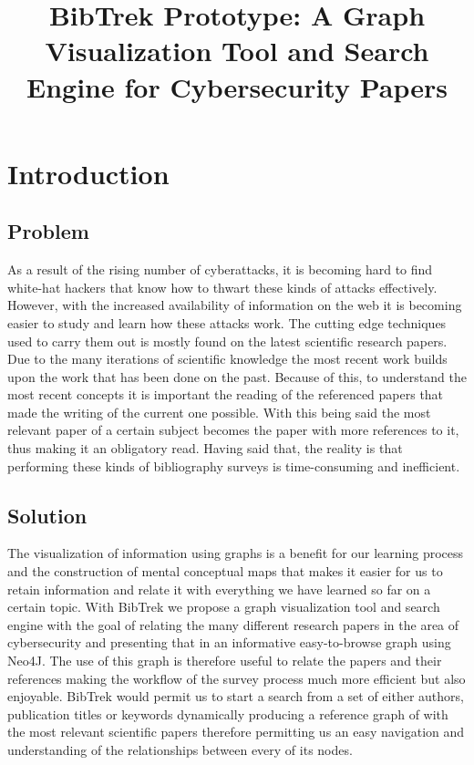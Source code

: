 \documentclass{article}
\begin{document}
\title{\textbf{BibTrek Prototype: A Graph Visualization Tool and Search Engine for Cybersecurity Papers}}
\date{}
\maketitle

\section{Introduction}
\subsection{Problem}
As a result of the rising number of cyberattacks, it is becoming hard to find white-hat hackers that know how to thwart these kinds of attacks effectively. However, with the increased availability of information on the web it is becoming easier to study and learn how these attacks work. The cutting edge techniques used to carry them out is mostly found on the latest scientific research papers. Due to the many iterations of scientific knowledge the most recent work builds upon the work that has been done on the past. Because of this, to understand the most recent concepts it is important the reading of the referenced papers that made the writing of the current one possible. With this being said the most relevant paper of a certain subject becomes the paper with more references to it, thus making it an obligatory read. Having said that, the reality is that performing these kinds of bibliography surveys is time-consuming and inefficient.

\subsection{Solution}
The visualization of information using graphs is a benefit for our learning process and the construction of mental conceptual maps that makes it easier for us to retain information and relate it with everything we have learned so far on a certain topic.
With BibTrek we propose a graph visualization tool and search engine with the goal of relating the many different research papers in the area of cybersecurity and presenting that in an informative easy-to-browse graph using Neo4J. The use of this graph is therefore useful to relate the papers and their references making the workflow of the survey process much more efficient but also enjoyable. BibTrek would permit us to start a search from a set of either authors, publication titles or keywords dynamically producing a reference graph of with the most relevant scientific papers therefore permitting us an easy navigation and understanding of the relationships between every of its nodes.
\end{document}
